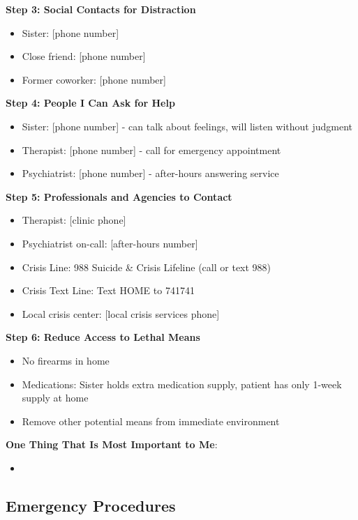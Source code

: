 \documentclass[11pt,letterpaper]{article}
\begin{document}
\textbf{Step 3: Social Contacts for Distraction}
\begin{itemize}[leftmargin=*]
    \item Sister: [phone number]
    \item Close friend: [phone number]
    \item Former coworker: [phone number]
\end{itemize}

\textbf{Step 4: People I Can Ask for Help}
\begin{itemize}[leftmargin=*]
    \item Sister: [phone number] - can talk about feelings, will listen without judgment
    \item Therapist: [phone number] - call for emergency appointment
    \item Psychiatrist: [phone number] - after-hours answering service
\end{itemize}

\textbf{Step 5: Professionals and Agencies to Contact}
\begin{itemize}[leftmargin=*]
    \item Therapist: [clinic phone]
    \item Psychiatrist on-call: [after-hours number]
    \item Crisis Line: 988 Suicide \& Crisis Lifeline (call or text 988)
    \item Crisis Text Line: Text HOME to 741741
    \item Local crisis center: [local crisis services phone]
\end{itemize}

\textbf{Step 6: Reduce Access to Lethal Means}
\begin{itemize}[leftmargin=*]
    \item No firearms in home
    \item Medications: Sister holds extra medication supply, patient has only 1-week supply at home
    \item Remove other potential means from immediate environment
\end{itemize}

\textbf{One Thing That Is Most Important to Me}:
\begin{itemize}[leftmargin=*]
    \item [e.g., "My relationship with my sister - I don't want to hurt her"]
\end{itemize}

\subsection*{Emergency Procedures}
\end{document}
